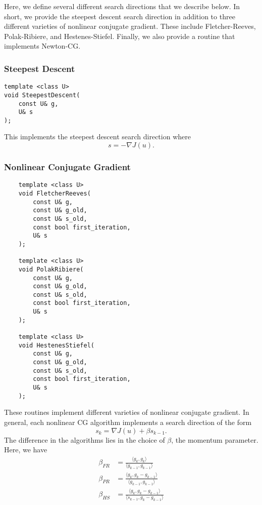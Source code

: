 \documentclass{article}
\begin{document}
	Here, we define several different search directions that we describe below.  In short, we provide the steepest descent search direction in addition to three different varieties of nonlinear conjugate gradient.  These include Fletcher-Reeves, Polak-Ribiere, and Hestenes-Stiefel.  Finally, we also provide a routine that implements Newton-CG.

\subsubsection{Steepest Descent}

\begin{flushleft}
\begin{lstlisting}
template <class U>
void SteepestDescent(
    const U& g,
    U& s
);
\end{lstlisting}
\end{flushleft}
This implements the steepest descent search direction where
$$
	s=-\nabla J(u).
$$

\subsubsection{Nonlinear Conjugate Gradient}

\begin{flushleft}
\begin{lstlisting}
    template <class U>
    void FletcherReeves(
        const U& g,
        const U& g_old,
        const U& s_old,
        const bool first_iteration,
        U& s
    );

    template <class U>
    void PolakRibiere(
        const U& g,
        const U& g_old,
        const U& s_old,
        const bool first_iteration,
        U& s
    );

    template <class U>
    void HestenesStiefel(
        const U& g,
        const U& g_old,
        const U& s_old,
        const bool first_iteration,
        U& s
    );
\end{lstlisting}
\end{flushleft}

These routines implement different varieties of nonlinear conjugate gradient.  In general, each nonlinear CG algorithm implements a search direction of the form
$$
	s_k=\nabla J(u)+\beta s_{k-1}.
$$
The difference in the algorithms lies in the choice of $\beta$, the momentum parameter.  Here, we have
\begin{align*}
	\beta_{FR}&=\frac{\langle g_k,g_k\rangle}{\langle g_{k-1},g_{k-1}\rangle}\\
	\beta_{PR}&=\frac{\langle g_k,g_k-g_{k-1}\rangle}{\langle g_{k-1},g_{k-1}\rangle}\\
	\beta_{HS}&=\frac{\langle g_k,g_k-g_{k-1}\rangle}{\langle s_{k-1},g_k-g_{k-1}\rangle}
\end{align*}
\end{document}
